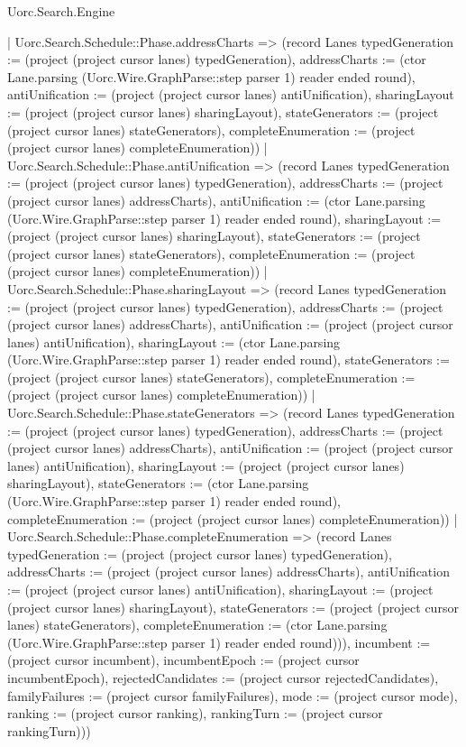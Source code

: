 \begin{lexlean}{Uorc.Search.Engine}
\begin{semanticmodule}
{{        | Uorc.Search.Schedule::Phase.addressCharts => (record Lanes {typedGeneration := (project (project cursor lanes) typedGeneration), addressCharts := (ctor Lane.parsing (Uorc.Wire.GraphParse::step parser 1) reader ended round), antiUnification := (project (project cursor lanes) antiUnification), sharingLayout := (project (project cursor lanes) sharingLayout), stateGenerators := (project (project cursor lanes) stateGenerators), completeEnumeration := (project (project cursor lanes) completeEnumeration)})
        | Uorc.Search.Schedule::Phase.antiUnification => (record Lanes {typedGeneration := (project (project cursor lanes) typedGeneration), addressCharts := (project (project cursor lanes) addressCharts), antiUnification := (ctor Lane.parsing (Uorc.Wire.GraphParse::step parser 1) reader ended round), sharingLayout := (project (project cursor lanes) sharingLayout), stateGenerators := (project (project cursor lanes) stateGenerators), completeEnumeration := (project (project cursor lanes) completeEnumeration)})
        | Uorc.Search.Schedule::Phase.sharingLayout => (record Lanes {typedGeneration := (project (project cursor lanes) typedGeneration), addressCharts := (project (project cursor lanes) addressCharts), antiUnification := (project (project cursor lanes) antiUnification), sharingLayout := (ctor Lane.parsing (Uorc.Wire.GraphParse::step parser 1) reader ended round), stateGenerators := (project (project cursor lanes) stateGenerators), completeEnumeration := (project (project cursor lanes) completeEnumeration)})
        | Uorc.Search.Schedule::Phase.stateGenerators => (record Lanes {typedGeneration := (project (project cursor lanes) typedGeneration), addressCharts := (project (project cursor lanes) addressCharts), antiUnification := (project (project cursor lanes) antiUnification), sharingLayout := (project (project cursor lanes) sharingLayout), stateGenerators := (ctor Lane.parsing (Uorc.Wire.GraphParse::step parser 1) reader ended round), completeEnumeration := (project (project cursor lanes) completeEnumeration)})
        | Uorc.Search.Schedule::Phase.completeEnumeration => (record Lanes {typedGeneration := (project (project cursor lanes) typedGeneration), addressCharts := (project (project cursor lanes) addressCharts), antiUnification := (project (project cursor lanes) antiUnification), sharingLayout := (project (project cursor lanes) sharingLayout), stateGenerators := (project (project cursor lanes) stateGenerators), completeEnumeration := (ctor Lane.parsing (Uorc.Wire.GraphParse::step parser 1) reader ended round)})), incumbent := (project cursor incumbent), incumbentEpoch := (project cursor incumbentEpoch), rejectedCandidates := (project cursor rejectedCandidates), familyFailures := (project cursor familyFailures), mode := (project cursor mode), ranking := (project cursor ranking), rankingTurn := (project cursor rankingTurn)}))
}
\end{semanticmodule}
\end{lexlean}
